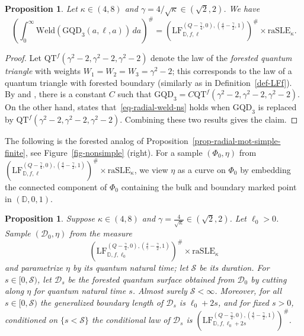 \documentclass[a4paper]{article}
\numberwithin{equation}{section}
\newcommand{\eqb}{\begin{equation}}
\newcommand{\eqe}{\end{equation}}
\newcommand{\bbD}{\mathbb{D}}
\newcommand{\D}{\mathbb{D}}
\newcommand{\cD}{\mathcal{D}}
\newcommand{\qduration}{\mathcal{S}}
\newcommand{\GQD}{\mathrm{GQD}}
\newcommand{\QT}{\mathrm{QT}}
\newcommand{\LF}{\mathrm{LF}}
\newtheorem{proposition}[theorem]{Proposition}
\theoremstyle{remark}
\numberwithin{equation}{section}
\begin{document}
\begin{proposition}\label{prop-radial-weld-ns}
Let $\kappa \in (4,8)$ and $\gamma = 4/\sqrt\kappa \in (\sqrt2,2)$. We have 
\eqb\label{eq-radial-weld-ns}
\left(\int_0^\infty \mathrm{Weld}(\GQD_{3}(a, \ell, a)) \, da \right)^\# = (\LF_{\mathbb D, f, \ell}^{(Q-\frac\gamma4, 0), (\frac4\gamma - \frac\gamma2, 1)})^\# \times \mathrm{raSLE}_\kappa.
\eqe 
\end{proposition}
\begin{proof}
Let $\mathrm{QT}^f(\gamma^2-2, \gamma^2-2, \gamma^2-2)$ denote the law of the \emph{forested quantum triangle} with weights $W_1 = W_2 = W_3 = \gamma^2-2$; this corresponds to the law of a quantum  triangle with forested boundary (similarly as in Definition~\ref{def-LFf}). By \cite[Lemma 6.4]{ay-radial} and \cite[Definition 3.9]{ahsy-nonsimple}, there is a constant $C$ such that $\GQD_3 = C \QT^f(\gamma^2-2, \gamma^2-2, \gamma^2-2)$. On the other hand, \cite[Theorem 1.3]{ay-radial} states that~\eqref{eq-radial-weld-ns} holds when $\GQD_3$ is replaced by $\QT^f(\gamma^2-2, \gamma^2-2, \gamma^2-2)$. Combining these two results gives the claim. 
\end{proof}

The following is the forested analog of Proposition~\ref{prop-radial-mot-simple-finite}, see Figure~\ref{fig-nonsimple} (right). For a sample $(\Phi_0,\eta)$ from $(\LF_{\bbD, f, \ell}^{(Q-\frac{\gamma}{4},0),(\frac4\gamma - \frac\gamma2,1)})^\#\times \mathrm{raSLE}_\kappa$, we view $\eta$ as a curve on $\Phi_0$ by embedding the connected component of $\Phi_0$ containing the bulk and boundary marked point in $(\D, 0, 1)$. 

\begin{proposition}\label{prop-radial-forested-zipper}
Suppose $\kappa \in (4, 8)$ and $\gamma = \frac4{\sqrt\kappa} \in (\sqrt2,2)$. Let $\ell_0 > 0$. Sample $(\cD_0,\eta)$
    from the measure 
    \[
    (\LF_{\bbD, f, \ell_0}^{(Q-\frac{\gamma}{4},0),(\frac4\gamma - \frac\gamma2,1)})^\#\times \mathrm{raSLE}_\kappa
    \]
    and parametrize {$\eta$} by its quantum natural time; let $\qduration$ be its duration. For $s \in [0, \qduration)$, let $\cD_s$ be the forested quantum surface obtained from $\cD_0$ by cutting along $\eta$ for quantum natural time $s$. Almost surely $\qduration < \infty$. Moreover, for all $s \in [0,\qduration)$ the generalized boundary length of $\cD_s$ is $\ell_0 + 2s$, and for fixed $s > 0$, conditioned on $\{s < \qduration\}$ the conditional law of $\cD_s$ is $(\LF_{\bbD, f, \ell_0+2s}^{(Q-\frac{\gamma}{4},0),(\frac4\gamma - \frac\gamma2,1)})^\#$.
\end{proposition}
\end{document}
